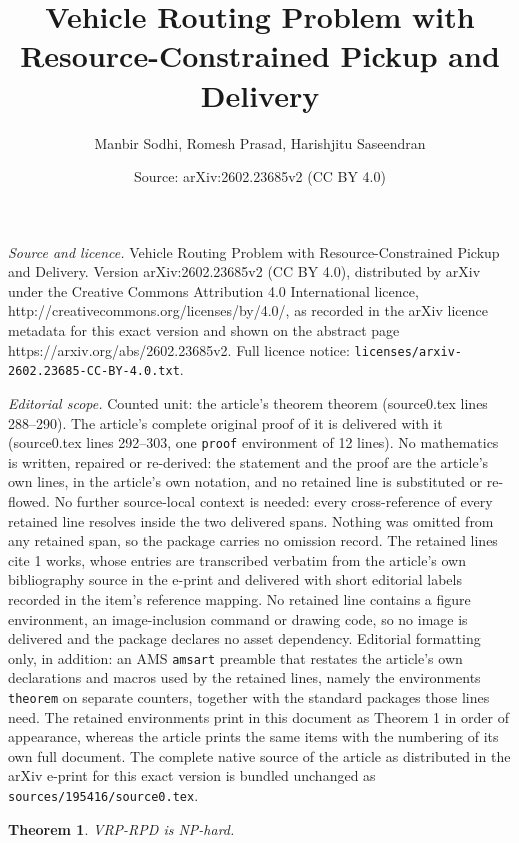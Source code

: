 \documentclass[10pt,a4paper]{amsart}
\title{Vehicle Routing Problem with Resource-Constrained Pickup and Delivery}
\author{Manbir Sodhi, Romesh Prasad, Harishjitu Saseendran}
\date{Source: arXiv:2602.23685v2 (CC BY 4.0)}
\newtheorem{theorem}{Theorem}
\begin{document}
\maketitle

\noindent\emph{Source and licence.} Vehicle Routing Problem with Resource-Constrained Pickup and Delivery. Version arXiv:2602.23685v2 (CC BY 4.0), distributed by arXiv under the Creative Commons Attribution 4.0 International licence, http://creativecommons.org/licenses/by/4.0/, as recorded in the arXiv licence metadata for this exact version and shown on the abstract page https://arxiv.org/abs/2602.23685v2. Full licence notice: \texttt{licenses/arxiv-2602.23685-CC-BY-4.0.txt}.\par\smallskip

\noindent\textit{Editorial scope.} Counted unit: the article's theorem theorem (source0.tex lines 288--290). The article's complete original proof of it is delivered with it (source0.tex lines 292--303, one \texttt{proof} environment of 12 lines). No mathematics is written, repaired or re-derived: the statement and the proof are the article's own lines, in the article's own notation, and no retained line is substituted or re-flowed.  No further source-local context is needed: every cross-reference of every retained line resolves inside the two delivered spans.  Nothing was omitted from any retained span, so the package carries no omission record.  The retained lines cite 1 works, whose entries are transcribed verbatim from the article's own bibliography source in the e-print and delivered with short editorial labels recorded in the item's reference mapping.  No retained line contains a figure environment, an image-inclusion command or drawing code, so no image is delivered and the package declares no asset dependency.  Editorial formatting only, in addition: an AMS \texttt{amsart} preamble that restates the article's own declarations and macros used by the retained lines, namely the environments \texttt{theorem} on separate counters, together with the standard packages those lines need.  The retained environments print in this document as Theorem 1 in order of appearance, whereas the article prints the same items with the numbering of its own full document.  The complete native source of the article as distributed in the arXiv e-print for this exact version is bundled unchanged as \texttt{sources/195416/source0.tex}.
\begin{theorem}
VRP-RPD is NP-hard.
\end{theorem}
\end{document}
